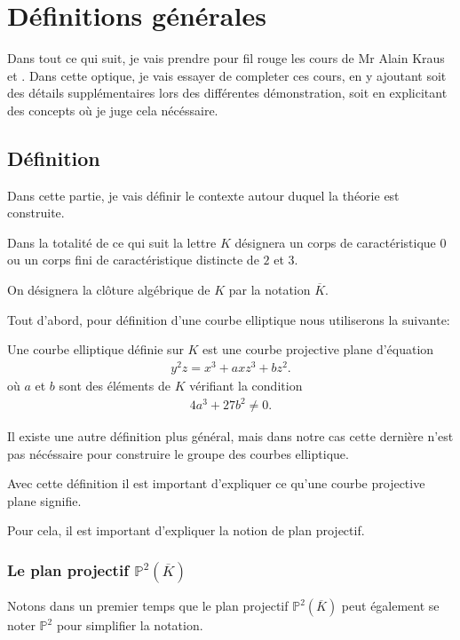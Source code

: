 \chapter{Définitions générales}
Dans tout ce qui suit, je vais prendre pour fil rouge les cours de Mr Alain Kraus
\cite{KrausCP} et \cite{KrausCE}. Dans cette optique, je vais essayer de completer ces cours,
en y ajoutant soit des détails supplémentaires lors des différentes démonstration, soit
en explicitant des concepts où je juge cela nécéssaire.
\section{Définition}
Dans cette partie, je vais définir le contexte autour duquel la théorie est construite.

Dans la totalité de ce qui suit la lettre $K$ désignera un corps de caractéristique $0$ ou un corps fini de caractéristique distincte de $2$ et $3$.

On désignera la clôture algébrique de $K$ par la notation $\overline{K}$.

Tout d'abord, pour définition d'une courbe elliptique nous utiliserons la suivante:

\begin{definition}
    \label{def:ell}
    Une courbe elliptique définie sur $K$ est une courbe projective plane d'équation
    \begin{align}
        \label{eq:ell}
    y^2z=x^3+axz^3+bz^2
    .\end{align}
    où $a$ et $b$ sont des éléments de $K$ vérifiant la condition
    \begin{align}
        \label{eq:delta}
    4a^3+27b^2\neq 0
    .\end{align}
\end{definition}

\begin{remarque}
    Il existe une autre définition plus général, mais dans notre cas cette dernière n'est
    pas nécéssaire pour construire le groupe des courbes elliptique.
\end{remarque}

Avec cette définition il est important d'expliquer ce qu'une courbe projective plane signifie.

Pour cela, il est important d'expliquer la notion de plan projectif.

\subsection{Le plan projectif $\mathbb{P}^2(\overline{K})$}
Notons dans un premier temps que le plan projectif $\mathbb{P}^2(\overline{K})$ peut
également se noter $\mathbb{P}^2$ pour simplifier la notation.

